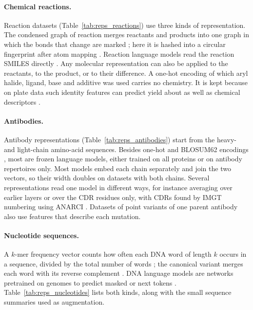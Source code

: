 \paragraph{Chemical reactions.} Reaction datasets (Table~\ref{tab:reps_reactions}) use three kinds of representation. The condensed graph of reaction merges reactants and products into one graph in which the bonds that change are marked \citep{Hoonakker2011}; here it is hashed into a circular fingerprint after atom mapping \citep{Schwaller2021rxnmapper}. Reaction language models read the reaction SMILES directly \citep{Schwaller2021rxnfp, Sagawa2023ReactionT5}. Any molecular representation can also be applied to the reactants, to the product, or to their difference. A one-hot encoding of which aryl halide, ligand, base and additive was used carries no chemistry. It is kept because on plate data such identity features can predict yield about as well as chemical descriptors \citep{Chuang2018}.

\paragraph{Antibodies.} Antibody representations (Table~\ref{tab:reps_antibodies}) start from the heavy- and light-chain amino-acid sequences. Besides one-hot and BLOSUM62 encodings \citep{Henikoff1992}, most are frozen language models, either trained on all proteins or on antibody repertoires only. Most models embed each chain separately and join the two vectors, so their width doubles on datasets with both chains. Several representations read one model in different ways, for instance averaging over earlier layers or over the CDR residues only, with CDRs found by IMGT numbering \citep{Lefranc2003} using ANARCI \citep{Dunbar2016ANARCI}. Datasets of point variants of one parent antibody also use features that describe each mutation.

\paragraph{Nucleotide sequences.} A $k$-mer frequency vector counts how often each DNA word of length $k$ occurs in a sequence, divided by the total number of words \citep{Vinga2003}; the canonical variant merges each word with its reverse complement \citep{Teeling2004}. DNA language models are networks pretrained on genomes to predict masked or next tokens \citep{Zhou2023DNABERT2, DallaTorre2025, Nguyen2023HyenaDNA}. Table~\ref{tab:reps_nucleotides} lists both kinds, along with the small sequence summaries used as augmentation.

